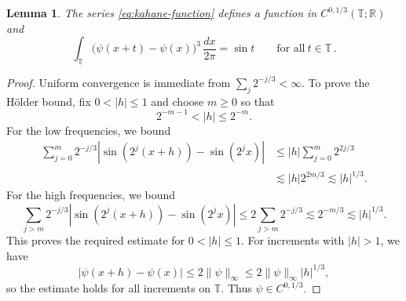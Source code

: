 \documentclass[10pt,a4paper]{amsart}
\newtheorem{lemma}[theorem]{Lemma}
\newcommand{\T}{\mathbb T}
\newcommand{\R}{\mathbb R}
\begin{document}
\begin{lemma}\label{lem:kahane}
The series \eqref{eq:kahane-function} defines a function in $C^{0,1/3}(\T;\R)$ and
\begin{equation}\label{eq:kahane-identity}
 \int_\T
 \big(\psi(x+t)-\psi(x)\big)^3\,\frac{dx}{2\pi}
 =\sin t
 \qquad\text{for all}\ t\in\T \,.
\end{equation}
\end{lemma}

\begin{proof}
Uniform convergence is immediate from $\sum_j2^{-j/3}<\infty$.  To prove the H\"older bound, fix $0<|h|\leq1$ and choose $m\geq0$ so that
\[
 2^{-m-1}<|h|\leq2^{-m}.
\]
For the low frequencies, we bound
\begin{align*}
 \sum_{j=0}^m2^{-j/3}
 |\sin(2^j(x+h))-\sin(2^j x)|
 &\leq |h|\sum_{j=0}^m2^{2j/3}\\
 &\lesssim |h|2^{2m/3}
 \lesssim |h|^{1/3}.
\end{align*}
For the high frequencies, we bound
\[
 \sum_{j>m}2^{-j/3}
 |\sin(2^j(x+h))-\sin(2^j x)|
 \leq2\sum_{j>m}2^{-j/3}
 \lesssim 2^{-m/3}
 \lesssim |h|^{1/3}.
\]
This proves the required estimate for $0<|h|\leq1$. For increments with
$|h|>1$, we have
\[
 |\psi(x+h)-\psi(x)|
 \leq2\|\psi\|_\infty
 \leq2\|\psi\|_\infty |h|^{1/3},
\]
so the estimate holds for all increments on $\T$. Thus
$\psi\in C^{0,1/3}$.


\end{proof}
\end{document}
